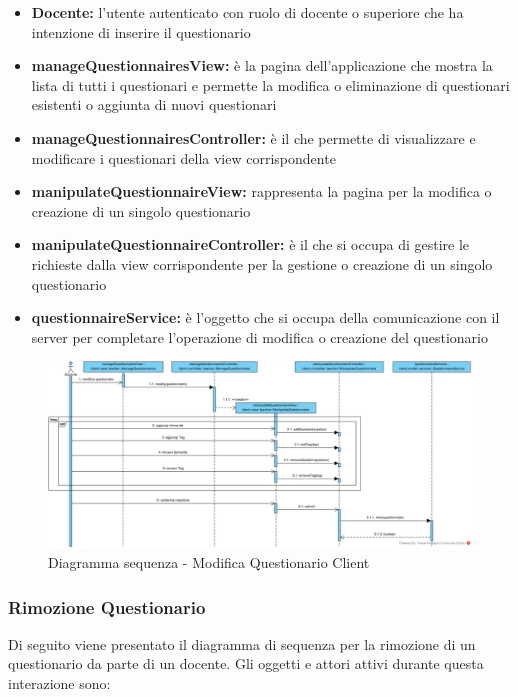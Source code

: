 \documentclass[12pt,a4paper]{article}
\begin{document}
\begin{itemize}
	\item \textbf{Docente:}	 l'utente autenticato con ruolo di docente o superiore che ha intenzione di inserire il questionario
	\item \textbf{manageQuestionnairesView:} è la pagina dell'applicazione che mostra la lista di tutti i questionari e permette la modifica o eliminazione di questionari esistenti o aggiunta di nuovi questionari
	\item \textbf{manageQuestionnairesController:} è il  che permette di visualizzare e modificare i questionari della view corrispondente
	\item \textbf{manipulateQuestionnaireView:} rappresenta la pagina per la modifica o creazione di un singolo questionario
	\item \textbf{manipulateQuestionnaireController:} è il  che si occupa di gestire le richieste dalla view corrispondente per la gestione o creazione di un singolo questionario
	\item \textbf{questionnaireService:} è l'oggetto che si occupa della comunicazione con il server per completare l'operazione di modifica o creazione del questionario
\end{itemize}

\begin{center}
	\begin{figure}[H]
		\centering \includegraphics[max width=\myheight, angle=90]{../img/diagrammiSequenza/modificaQuestionarioClient.png}
		\caption{Diagramma sequenza - Modifica Questionario Client}
	\end{figure}
\end{center}

\newpage
\subsubsection{Rimozione Questionario}
Di seguito viene presentato il diagramma di sequenza per la rimozione di un questionario da parte di un docente. Gli oggetti e attori attivi durante questa interazione sono:
\end{document}
